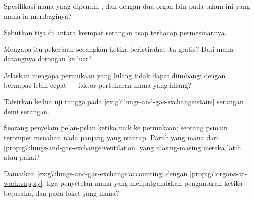 \begin{exercise}[$\star$]\label{exo:g7:lungs-and-gas-exchange:5}
Spesifikasi mana yang dipenuhi , dan dengan dua organ lain
pada tahun ini yang mana ia membaginya?
\end{exercise}

\begin{exercise}[$\star$]\label{exo:g7:lungs-and-gas-exchange:6}
Sebutkan tiga di antara keempat serangan asap terhadap permesinannya.
\end{exercise}

\begin{exercise}[$\star\star$]\label{exo:g7:lungs-and-gas-exchange:7}
Mengapa  itu pekerjaan sedangkan 
ketika beristirahat itu gratis? Dari mana datangnya dorongan ke luar?
\end{exercise}

\begin{exercise}[$\star\star$]\label{exo:g7:lungs-and-gas-exchange:8}
Jelaskan mengapa permukaan  yang hilang tidak dapat
diimbangi dengan bernapas lebih cepat --- faktor pertukaran mana yang
hilang?
\end{exercise}

\begin{exercise}[$\star\star$]\label{exo:g7:lungs-and-gas-exchange:9}
Tafsirkan kedua uji tangga pada
\cref{ex:g7:lungs-and-gas-exchange:stairs} serangan demi serangan.
\end{exercise}

\begin{exercise}[$\star\star$]\label{exo:g7:lungs-and-gas-exchange:10}
Seorang penyelam  pelan-pelan ketika naik ke
permukaan; seorang pemain terompet menahan nada panjang yang mantap.
Paruh yang mana dari
\cref{prop:g7:lungs-and-gas-exchange:ventilation} yang masing-masing
mereka latih atau pakai?
\end{exercise}

\begin{exercise}[$\star\star$]\label{exo:g7:lungs-and-gas-exchange:11}
Damaikan \cref{ex:g7:lungs-and-gas-exchange:accounting} dengan
\cref{prop:g7:organs-at-work:supply}: tiga penyetelan mana yang
melipatgandakan pengantaran ketika berusaha, dan pada loket yang mana?
\end{exercise}

